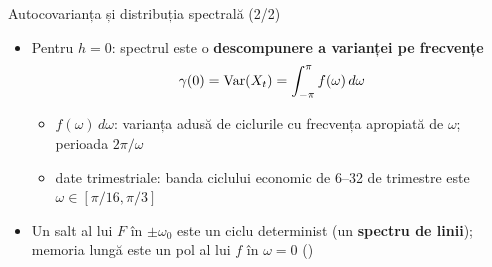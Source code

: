 \begin{frame}{Autocovarianța și distribuția spectrală (2/2)}
\itemsize{\small}
\begin{itemize}
    \item Pentru $h = 0$: spectrul este o \textbf{descompunere a varianței pe frecvențe}
    \[ \gamma(0) = \text{Var}(X_t) = \int_{-\pi}^{\pi}f(\omega)\,d\omega \]
    \begin{itemize}
        \item $f(\omega)\,d\omega$: varianța adusă de ciclurile cu frecvența apropiată de $\omega$; perioada $2\pi/\omega$
        \item date trimestriale: banda ciclului economic de 6--32 de trimestre este $\omega \in [\pi/16, \pi/3]$
    \end{itemize}
    \item Un salt al lui $F$ în $\pm\omega_0$ este un ciclu determinist (un \textbf{spectru de linii}); memoria lungă este un pol al lui $f$ în $\omega = 0$ ()
\end{itemize}
\end{frame}

